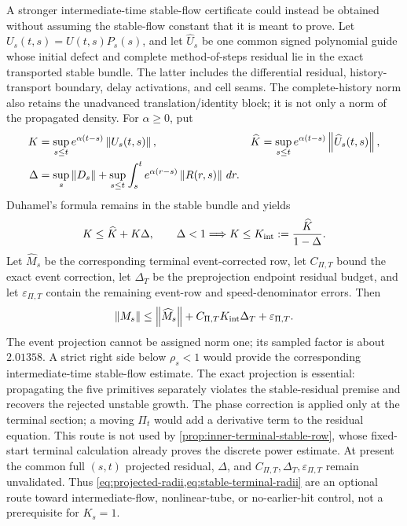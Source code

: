 A stronger intermediate-time stable-flow certificate could instead be
obtained without assuming the stable-flow constant that it is meant to prove.
Let \(U_s(t,s)=U(t,s)P_s(s)\), and let
\(\widehat U_s\) be one common signed polynomial guide whose initial defect
and complete method-of-steps residual lie in the exact transported stable
bundle.  The latter includes the differential residual, history-transport
boundary, delay activations, and cell seams.  The complete-history norm also
retains the unadvanced translation/identity block; it is not only a norm of
the propagated density.  For \(\alpha\ge0\), put
\begin{align*}
 K&=\sup_{s\le t}e^{\alpha(t-s)}\left\lVert U_s(t,s)\right\rVert,&
 \widehat K&=\sup_{s\le t}e^{\alpha(t-s)}
                    \left\lVert\widehat U_s(t,s)\right\rVert,\\
 \Delta&=\sup_s\left\lVert D_s\right\rVert
 +\sup_{s\le t}\int_s^t e^{\alpha(r-s)}
                    \left\lVert R(r,s)\right\rVert\,dr .
\end{align*}
Duhamel's formula remains in the stable bundle and yields
\begin{equation}
 K\le\widehat K+K\Delta,\qquad
 \Delta<1\Longrightarrow
 K\le K_{\rm int}:=\frac{\widehat K}{1-\Delta}.       \label{eq:projected-radii}
\end{equation}
Let \(\widehat M_s\) be the corresponding terminal event-corrected row, let
\(C_{\Pi,T}\) bound the exact event correction, let \(\Delta_T\) be the
preprojection endpoint residual budget, and let \(\varepsilon_{\Pi,T}\)
contain the remaining event-row and speed-denominator errors.  Then
\begin{equation}
 \left\lVert M_s\right\rVert\le\left\lVert\widehat M_s\right\rVert
                 +C_{\Pi,T}K_{\rm int}\Delta_T
                 +\varepsilon_{\Pi,T}.
                                                               \label{eq:stable-terminal-radii}
\end{equation}
The event projection cannot be assigned norm one; its sampled factor is
about \(2.01358\).  A strict right side below \(\rho_s<1\) would provide the
corresponding intermediate-time stable-flow estimate.  The exact projection
is essential: propagating the five primitives separately violates the
stable-residual premise and recovers the rejected unstable growth.  The phase
correction is applied only at the terminal section; a moving \(\Pi_t\) would
add a derivative term to the residual equation.  This route is not used by
\cref{prop:inner-terminal-stable-row}, whose fixed-start terminal calculation
already proves the discrete power estimate.  At present the common full
\((s,t)\) projected residual, \(\Delta\), and
\(C_{\Pi,T},\Delta_T,\varepsilon_{\Pi,T}\) remain unvalidated.  Thus
\cref{eq:projected-radii,eq:stable-terminal-radii} are an optional route toward
intermediate-flow, nonlinear-tube, or no-earlier-hit control, not a
prerequisite for \(K_s=1\).

